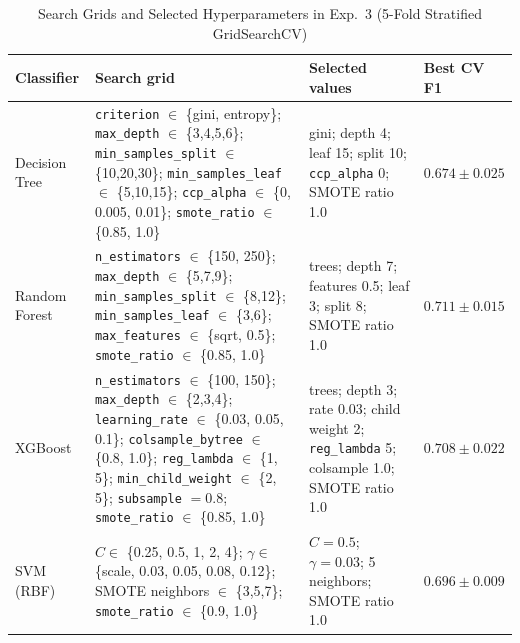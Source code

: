 \documentclass[journal]{IEEEtran}
\begin{document}
\begin{table}[t]
\centering
\caption{Search Grids and Selected Hyperparameters in Exp.~3 (5-Fold Stratified GridSearchCV)}
\label{tab:hyperparams}
\footnotesize
\begin{tabular}{>{\raggedright\arraybackslash}p{1.8cm}>{\raggedright\arraybackslash}p{6.9cm}>{\raggedright\arraybackslash}p{5.9cm}>{\raggedright\arraybackslash}p{2.0cm}}
\toprule
\textbf{Classifier} & \textbf{Search grid} & \textbf{Selected values} & \textbf{Best CV F1} \\
\midrule
Decision Tree & \texttt{criterion} $\in$ \{gini, entropy\}; \texttt{max\_depth} $\in$ \{3,4,5,6\}; \texttt{min\_samples\_split} $\in$ \{10,20,30\}; \texttt{min\_samples\_leaf} $\in$ \{5,10,15\}; \texttt{ccp\_alpha} $\in$ \{0, 0.005, 0.01\}; \texttt{smote\_ratio} $\in$ \{0.85, 1.0\} & gini; depth 4; leaf 15; split 10; \texttt{ccp\_alpha} 0; SMOTE ratio 1.0 & $0.674 \pm 0.025$ \\
\addlinespace[3pt]
Random Forest & \texttt{n\_estimators} $\in$ \{150, 250\}; \texttt{max\_depth} $\in$ \{5,7,9\}; \texttt{min\_samples\_split} $\in$ \{8,12\}; \texttt{min\_samples\_leaf} $\in$ \{3,6\}; \texttt{max\_features} $\in$ \{sqrt, 0.5\}; \texttt{smote\_ratio} $\in$ \{0.85, 1.0\} & 250 trees; depth 7; features 0.5; leaf 3; split 8; SMOTE ratio 1.0 & $\mathbf{0.711 \pm 0.015}$ \\
\addlinespace[3pt]
XGBoost & \texttt{n\_estimators} $\in$ \{100, 150\}; \texttt{max\_depth} $\in$ \{2,3,4\}; \texttt{learning\_rate} $\in$ \{0.03, 0.05, 0.1\}; \texttt{colsample\_bytree} $\in$ \{0.8, 1.0\}; \texttt{reg\_lambda} $\in$ \{1, 5\}; \texttt{min\_child\_weight} $\in$ \{2, 5\}; \texttt{subsample} $= 0.8$; \texttt{smote\_ratio} $\in$ \{0.85, 1.0\} & 150 trees; depth 3; rate 0.03; child weight 2; \texttt{reg\_lambda} 5; colsample 1.0; SMOTE ratio 1.0 & $0.708 \pm 0.022$ \\
\addlinespace[3pt]
SVM (RBF) & $C \in$ \{0.25, 0.5, 1, 2, 4\}; $\gamma \in$ \{scale, 0.03, 0.05, 0.08, 0.12\}; SMOTE neighbors $\in$ \{3,5,7\}; \texttt{smote\_ratio} $\in$ \{0.9, 1.0\} & $C = 0.5$; $\gamma = 0.03$; 5 neighbors; SMOTE ratio 1.0 & $0.696 \pm 0.009$ \\
\bottomrule
\end{tabular}
\end{table}
\end{document}
